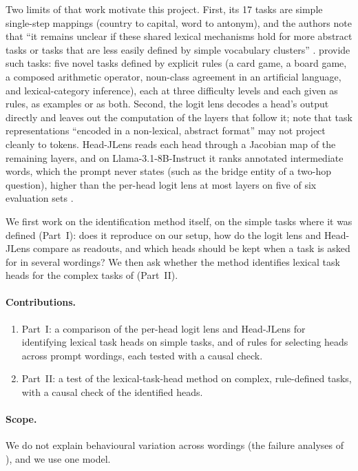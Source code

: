 \documentclass[11pt,a4paper]{article}
\begin{document}
Two limits of that work motivate this project. First, its 17 tasks are simple single-step mappings (country to capital, word to antonym), and the authors note that ``it remains unclear if these shared lexical mechanisms hold for more abstract tasks or tasks that are less easily defined by simple vocabulary clusters'' \citep[Sec.~4]{yang2026shared}. \citet{fu2026rules} provide such tasks: five novel tasks defined by explicit rules (a card game, a board game, a composed arithmetic operator, noun-class agreement in an artificial language, and lexical-category inference), each at three difficulty levels and each given as rules, as examples or as both. Second, the logit lens decodes a head's output directly and leaves out the computation of the layers that follow it; \citet[Sec.~4]{yang2026shared} note that task representations ``encoded in a non-lexical, abstract format'' may not project cleanly to tokens. Head-JLens reads each head through a Jacobian map of the remaining layers, and on Llama-3.1-8B-Instruct it ranks annotated intermediate words, which the prompt never states (such as the bridge entity of a two-hop question), higher than the per-head logit lens at most layers on five of six evaluation sets \citep[Sec.~3]{merlo2026headjlens}.

We first work on the identification method itself, on the simple tasks where it was defined (Part~I): does it reproduce on our setup, how do the logit lens and Head-JLens compare as readouts, and which heads should be kept when a task is asked for in several wordings? We then ask whether the method identifies lexical task heads for the complex tasks of \citet{fu2026rules} (Part~II).

\paragraph{Contributions.}
\begin{enumerate}
\item Part~I: a comparison of the per-head logit lens and Head-JLens for identifying lexical task heads on simple tasks, and of rules for selecting heads across prompt wordings, each tested with a causal check.
\item Part~II: a test of the lexical-task-head method on complex, rule-defined tasks, with a causal check of the identified heads.
\end{enumerate}

\paragraph{Scope.} We do not explain behavioural variation across wordings (the failure analyses of \citealp[Sec.~2.4]{yang2026shared}), and we use one model.
\end{document}
